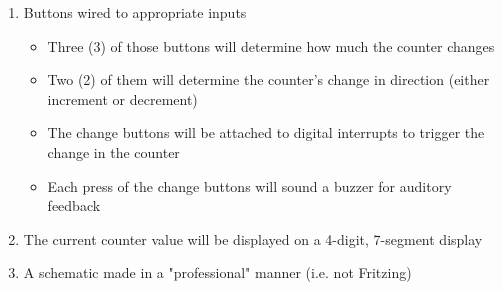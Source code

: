 \documentclass{article}
\begin{document}
    \begin{enumerate}
        \item Buttons wired to appropriate inputs
            \begin{itemize}
                \item Three (3) of those buttons will determine how much the counter changes
                \item Two (2) of them will determine the counter's change in direction (either increment or decrement)
                \item The change buttons will be attached to digital interrupts to trigger the change in the counter
                \item Each press of the change buttons will sound a buzzer for auditory feedback
            \end{itemize}
        \item The current counter value will be displayed on a 4-digit, 7-segment display
        \item A schematic made in a "professional" manner (i.e. not Fritzing)
    \end{enumerate}
\end{document}
